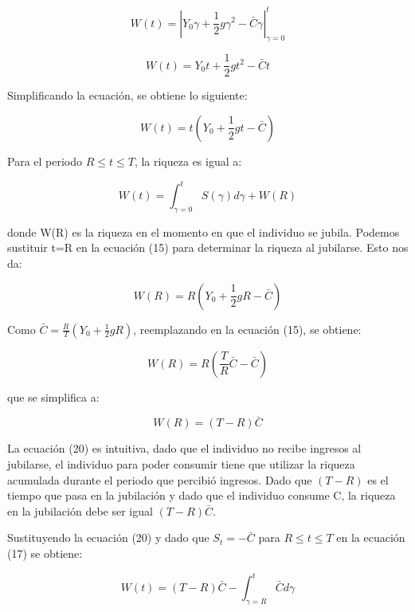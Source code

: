 \documentclass[
]{article}
\begin{document}
\begin{equation}
W(t)=\left|Y_0\gamma+\frac{1}{2}g\gamma^2-\bar C\gamma\right|_{\gamma=0}^{t}
\end{equation}

\begin{equation}
W(t)=Y_0t+\frac{1}{2}gt^2-\bar Ct
\end{equation}

Simplificando la ecuación, se obtiene lo siguiente:

\begin{equation}
W(t)=t(Y_0+\frac{1}{2}gt-\bar C)
\end{equation}

Para el periodo \(R\leq t \leq T\), la riqueza es igual a:

\begin{equation}
W(t)=\int_{\gamma=0}^{t}S(\gamma)d\gamma+W(R)
\end{equation}

donde W(R) es la riqueza en el momento en que el individuo se jubila.
Podemos sustituir t=R en la ecuación (15) para determinar la riqueza al
jubilarse. Esto nos da:

\begin{equation}
W(R)=R(Y_0+\frac{1}{2}gR-\bar C)
\end{equation}

Como \(\bar C= \frac {R}{T} (Y_0+\frac{1}{2}gR)\), reemplazando en la
ecuación (15), se obtiene:

\begin{equation}
W(R)=R(\frac{T}{R}\bar C-\bar C)
\end{equation}

que se simplifica a:

\begin{equation}
W(R)=(T-R)\bar C
\end{equation}

La ecuación (20) es intuitiva, dado que el individuo no recibe ingresos
al jubilarse, el individuo para poder consumir tiene que utilizar la
riqueza acumulada durante el periodo que percibió ingresos. Dado que
\((T-R)\) es el tiempo que pasa en la jubilación y dado que el individuo
consume C, la riqueza en la jubilación debe ser igual \((T-R)\bar C\).

Sustituyendo la ecuación (20) y dado que \(S_t=-\bar C\) para
\(R\leq t \leq T\) en la ecuación (17) se obtiene:

\begin{equation}
W(t)=(T-R)\bar C-\int_{\gamma=R}^{t}\bar Cd\gamma
\end{equation}
\end{document}
